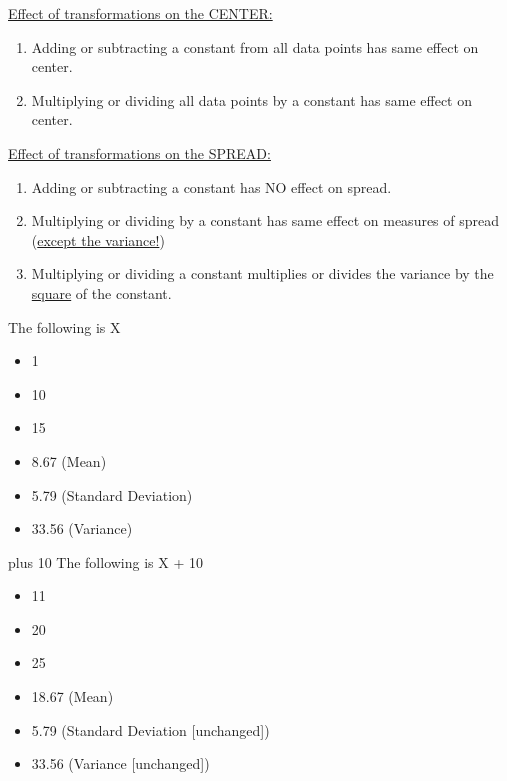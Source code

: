 \documentclass[11pt]{report}
\begin{document}
\underline{Effect of transformations on the CENTER:}
\begin{enumerate}
    \item Adding or subtracting a constant from all data points has same effect on center. 
    \item Multiplying or dividing all data points by a constant has same effect on center.
\end{enumerate}
\underline{Effect of transformations on the SPREAD:}
\begin{enumerate}
    \item Adding or subtracting a constant has NO effect on spread.
    \item Multiplying or dividing by a constant has same effect on measures of spread (\underline{except the variance!})
    \item Multiplying or dividing a constant multiplies or divides the variance by the \underline{square} of the constant.
\end{enumerate}
{
    \begin{multicols}{3}
        The following is X
        \begin{itemize}
            \item 1
            \item 10
            \item 15
        \end{itemize}
        \begin{itemize}
            \item 8.67 (Mean)
            \item 5.79 (Standard Deviation)
            \item 33.56 (Variance)
        \end{itemize}
        \columnbreak
        plus 10
        \columnbreak
        The following is X + 10
        \begin{itemize}
            \item 11
            \item 20
            \item 25
        \end{itemize}
        \begin{itemize}
            \item 18.67 (Mean)
            \item 5.79 (Standard Deviation [unchanged])
            \item 33.56 (Variance [unchanged])
        \end{itemize}
    \end{multicols}
}
\end{document}
